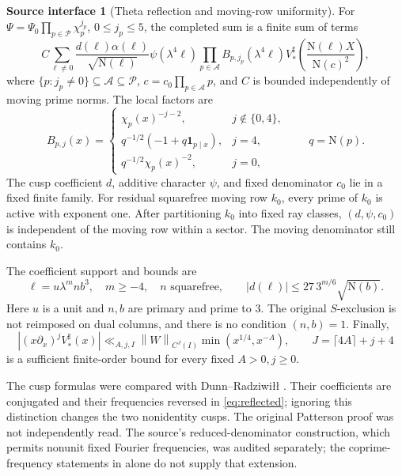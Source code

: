 \documentclass[11pt]{article}
\numberwithin{equation}{section}
\theoremstyle{definition}
\newtheorem{assumption}[theorem]{Source interface}
\theoremstyle{remark}
\newcommand{\N}{\mathrm N}
\newcommand{\ind}{\mathbf 1}
\newcommand{\norm}[1]{\left\|#1\right\|}
\begin{document}
\begin{assumption}[Theta reflection and moving-row uniformity]\label{in:theta}
For
\(\Psi=\Psi_0\prod_{p\in\mathcal P}\chi_p^{j_p}\),
\(0\le j_p\le5\), the completed sum is a finite sum of terms
\begin{equation}\label{eq:reflected}
 C\sum_{\ell\ne0}\frac{d(\ell)\alpha(\ell)}{\sqrt{\N(\ell)}}
 \psi(\lambda^4\ell)
 \prod_{p\in\mathcal A}B_{p,j_p}(\lambda^4\ell)
 V_*^\sharp\!\left(\frac{\N(\ell)X}{\N(c)^2}\right),
\end{equation}
where \(\{p:j_p\ne0\}\subseteq\mathcal A\subseteq\mathcal P\),
\(c=c_0\prod_{p\in\mathcal A}p\), and \(C\) is bounded independently
of moving prime norms. The local factors are
\begin{equation}\label{eq:B}
 B_{p,j}(x)=
 \begin{cases}
  \chi_p(x)^{-j-2},&j\notin\{0,4\},\\
  q^{-1/2}(-1+q\ind_{p\mid x}),&j=4,\\
  q^{-1/2}\chi_p(x)^{-2},&j=0,
 \end{cases}\qquad q=\N(p).
\end{equation}
The cusp coefficient \(d\), additive character \(\psi\), and
fixed denominator \(c_0\) lie in a fixed finite family. For residual
squarefree moving row \(k_0\), every prime of \(k_0\) is active with
exponent one. After partitioning \(k_0\) into fixed ray classes,
\((d,\psi,c_0)\) is independent of the moving row within a sector.
The moving denominator still contains \(k_0\).

The coefficient support and bounds are
\begin{equation}\label{eq:theta-bounds-audit}
 \ell=u\lambda^mnb^3,\quad m\ge-4,\quad n\text{ squarefree},
 \qquad |d(\ell)|\le27\,3^{m/6}\sqrt{\N(b)}.
\end{equation}
Here \(u\) is a unit and \(n,b\) are primary and prime to
\(3\). The original \(S\)-exclusion is not reimposed on dual columns,
and there is no condition \((n,b)=1\). Finally,
\begin{equation}\label{eq:decay}
 |(x\partial_x)^jV_*^\sharp(x)|
 \ll_{A,j,I}\norm{W}_{C^J(I)}
              \min(x^{1/4},x^{-A}),\qquad
 J=\lceil4A\rceil+j+4
\end{equation}
is a sufficient finite-order bound for every fixed \(A>0,j\ge0\).
\end{assumption}

The cusp formulas were compared with Dunn--Radziwi{\l}{\l}
\cite{DR}. Their coefficients are conjugated and their frequencies
reversed in \eqref{eq:reflected}; ignoring this distinction changes
the two nonidentity cusps. The original Patterson proof \cite{Pat}
was not independently read. The source's reduced-denominator
construction, which permits nonunit fixed Fourier frequencies,
was audited separately; the coprime-frequency statements in
\cite{DR} alone do not supply that extension.
\end{document}
